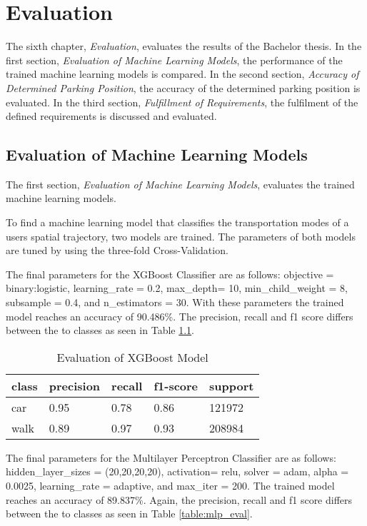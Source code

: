 \chapter{Evaluation}
The sixth chapter, \textit{Evaluation}, evaluates the results of the Bachelor thesis. In the first section,  
\textit{Evaluation of Machine Learning Models}, the performance of the trained machine learning models is compared. In the second section, \textit{Accuracy of Determined Parking Position}, the accuracy of the determined parking position is evaluated. In the third section, \textit{Fulfillment of Requirements}, the fulfilment of the defined requirements is discussed and evaluated.

\section{Evaluation of Machine Learning Models}
The first section, \textit{Evaluation of Machine Learning Models}, evaluates the trained machine learning models.

To find a machine learning model that classifies the transportation modes of a users spatial trajectory, two models are trained. The parameters of both models are tuned by using the three-fold Cross-Validation. 

The final parameters for the XGBoost Classifier are as follows: \linebreak objective = binary:logistic, learning\_rate = 0.2, max\_depth= 10, min\_child\_weight = 8, subsample = 0.4, and n\_estimators = 30. With these parameters the trained model reaches an accuracy of 90.486\%. The precision, recall and f1 score differs 
between the to classes as seen in Table \ref{table:xgb_eval}. 

\begin{table}[h!]
    \centering
    \begin{tabular}{|l|l|l|l|l|} \toprule
        class & precision & recall & f1-score & support \\ \midrule
        car & 0.95 & 0.78 & 0.86 & 121972 \\
        walk & 0.89 & 0.97 & 0.93 & 208984 \\ \bottomrule 
    \end{tabular}
    \caption{Evaluation of XGBoost Model}
    \label{table:xgb_eval}
\end{table}{}

The final parameters for the Multilayer Perceptron Classifier are as follows: \linebreak hidden\_layer\_sizes =  (20,20,20,20), activation= relu, solver = adam, alpha = 0.0025, learning\_rate = adaptive, and max\_iter = 200. The trained model reaches an accuracy of 89.837\%. Again, the  precision, recall and f1 score differs between the to classes as seen in Table \ref{table:mlp_eval}.

